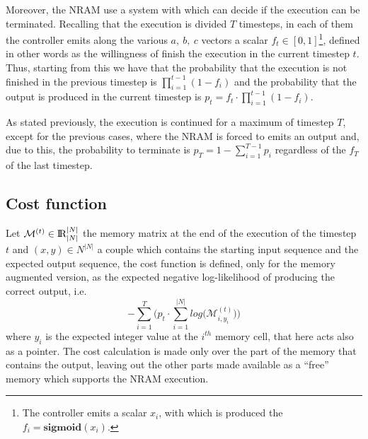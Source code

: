Moreover, the NRAM use a system with which can decide if the execution can be terminated. Recalling that the execution is divided $T$ timesteps, in each of them the controller emits along the various $a,\ b,\ c$ vectors a scalar $f_{t} \in [0, 1]$\footnote{The controller emits a scalar $x_{i}$, with which is produced the $f_i = \textbf{sigmoid}(x_{i})$.}, defined in other words as the willingness of finish the execution in the current timestep $t$. Thus, starting from this we have that the probability that the execution is not finished in the previous timestep is $\prod\limits_{i=1}^{t-1}(1 - f_{i})$ and the probability that the output is produced in the current timestep is $p_{t} = f_{t} \cdot \prod\limits_{i=1}^{t-1}(1 - f_{i})$. 

As stated previously, the execution is continued for a maximum of timestep $T$, except for the previous cases, where the NRAM is forced to emits an output and, due to this, the probability to terminate is $p_{T} = 1 - \sum\limits_{i=1}^{T-1}p_{i}$ regardless of the $f_{T}$ of the last timestep.

\subsection{Cost function}\label{subsec:cost-function}
Let $\mathcal{M}^{(t)} \in \textrm{I\!R}^{|N|}_{|N|}$ the memory matrix at the end of the execution of the timestep $t$ and $(x, y) \in N^{|N|}$ a couple which contains the starting input sequence and the expected output sequence, the cost function is defined, only for the memory augmented version, as the expected negative log-likelihood of producing the correct output, i.e.
\begin{equation}
	-\sum\limits_{i=1}^{T}\Bigg(p_{t}\cdot\sum\limits_{i=1}^{|N|}log\Big(\mathcal{M}_{i, y_{i}}^{(t)}\Big)\Bigg)
\end{equation}
where $y_i$ is the expected integer value at the $i^{th}$ memory cell, that here acts also as a pointer. The cost calculation is made only over the part of the memory that contains the output, leaving out the other parts made available as a ``free'' memory which supports the NRAM execution.